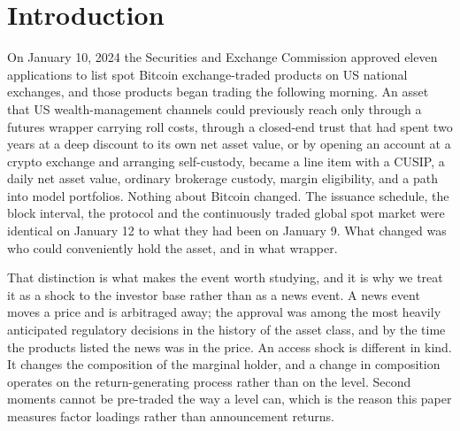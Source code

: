 \documentclass[12pt,a4paper]{article}
\begin{document}
\newpage
\onehalfspacing

\section{Introduction}

On January 10, 2024 the Securities and Exchange Commission approved eleven applications to list spot Bitcoin exchange-traded products on US national exchanges, and those products began trading the following morning.
An asset that US wealth-management channels could previously reach only through a futures wrapper carrying roll costs, through a closed-end trust that had spent two years at a deep discount to its own net asset value, or by opening an account at a crypto exchange and arranging self-custody, became a line item with a CUSIP, a daily net asset value, ordinary brokerage custody, margin eligibility, and a path into model portfolios. Nothing about Bitcoin changed. The issuance schedule, the block interval, the protocol and the continuously traded global spot market were identical on January 12 to what they had been on January 9. What changed was who could conveniently hold the asset, and in what wrapper.

That distinction is what makes the event worth studying, and it is why we treat it as a shock to the investor base rather than as a news event. A news event moves a price and is arbitraged away; the approval was among the most heavily anticipated regulatory decisions in the history of the asset class, and by the time the products listed the news was in the price. An access shock is different in kind. It changes the composition of the marginal holder, and a change in composition operates on the return-generating process rather than on the level. Second moments cannot be pre-traded the way a level can, which is the reason this paper measures factor loadings rather than announcement returns.
\end{document}
